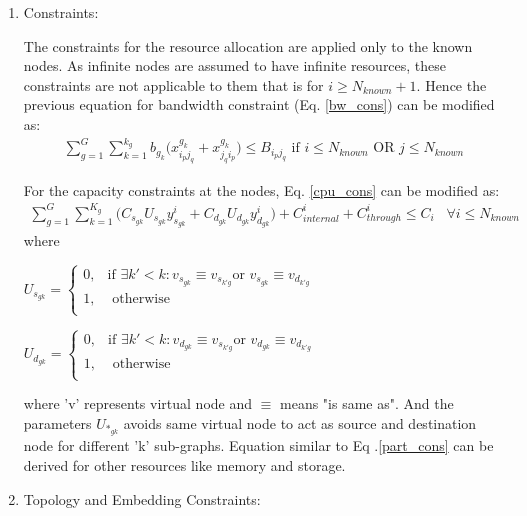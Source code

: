 \documentclass[article,dr=phil,type=msc ,colorback,accentcolor=tud4b]{tudthesis}
\begin{document}
\begin{enumerate}[label=(\Alph*)]
\item Constraints:

The constraints for the resource allocation are applied only to the known nodes. As infinite nodes are assumed to have infinite resources, these constraints are not applicable to them that is for $i \geq N_{known} + 1$. Hence the previous equation for bandwidth constraint (Eq. \ref{bw_cons}) can be modified as:
\begin{equation}  
\begin{split}
\sum_{g=1}^{G} \sum_{k=1}^{k_{g}} b_{g_{k}} \big(x_{i_{p}j_{q}}^{g_{k}} + x_{j_{q}i_{p}}^{g_{k}}\big) \leq B_{i_{p}j_{q}} \text{ if } i \leq N_{known} \text{ OR } j \leq N_{known}
\end{split}
\end{equation} 

For the capacity constraints at the nodes, Eq. \ref{cpu_cons} can be modified as: 
\begin{equation}  \label{part_cons}
\begin{split}
\sum_{g=1}^{G} \sum_{k=1}^{K_{g}} \big( C_{s_{gk}} U_{s_{gk}}  y^{i}_{s_{gk}} +  C_{d_{gk}} U_{d_{gk}} y^{i}_{d_{gk}} \big) + C_{internal}^{i} + C_{through}^{i} \leq C_{i} \;\;\; \forall i \leq N_{known}
\end{split}
\end{equation} 
where \newline

$U_{s_{gk}} = \begin{cases}
0, & \text{if }  \exists k' < k: v_{s_{gk}} \equiv v_{s_{k'g}} \text{or } v_{s_{gk}} \equiv v_{d_{k'g}} \\
1, & \text{ otherwise} \\
\end{cases}$	

$U_{d_{gk}} = \begin{cases}
0, & \text{if }  \exists k' < k: v_{d_{gk}} \equiv v_{s_{k'g}} \text{or } v_{d_{gk}} \equiv v_{d_{k'g}} \\
1, & \text{ otherwise} \\
\end{cases}$	


where 'v' represents virtual node and $\equiv$ means "is same as". And the parameters $U_{*_{gk}}$ avoids same virtual node to act as source and destination node for different 'k' sub-graphs. Equation similar to Eq .\ref{part_cons} can be derived for other resources like memory and storage.  
\item Topology and Embedding Constraints: 


\end{enumerate}
\end{document}
